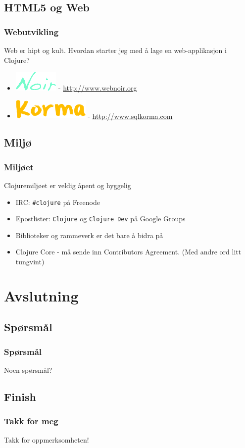\documentclass{beamer}
\begin{document}
\subsection{HTML5 og Web}
\begin{frame}
  \frametitle{Webutvikling}

  Web er hipt og kult. Hvordan starter jeg med å lage en web-applikasjon i
  Clojure?

  \begin{itemize}
  \item<2-> \includegraphics[height=1cm]{img/noir} -
    \url{http://www.webnoir.org}
  \item<3-> \includegraphics[height=1cm]{img/korma} -
    \url{http://www.sqlkorma.com}
  \end{itemize}

  \vspace{3mm}
\end{frame}

\subsection{Miljø}
\begin{frame}
  \frametitle{Miljøet}
  Clojuremiljøet er veldig åpent og hyggelig

  \begin{itemize}
  \item<2-> IRC: {\tt \#clojure} på Freenode
  \item<3-> Epostlister: {\tt Clojure} og {\tt Clojure Dev} på Google Groups
  \item<4-> Biblioteker og rammeverk er det bare å bidra på
  \item<5-> Clojure Core - må sende inn Contributors Agreement. (Med andre ord
    litt tungvint)
  \end{itemize}
\end{frame}

\section{Avslutning}
\subsection{Spørsmål}
\begin{frame}
  \frametitle{Spørsmål}
  \begin{center}
    {\Huge Noen spørsmål?}
  \end{center}
\end{frame}

\subsection{Finish}
\begin{frame}
  \frametitle{Takk for meg}
  \begin{center}
    {\Huge Takk for oppmerksomheten!}
  \end{center}
\end{frame}
\end{document}
